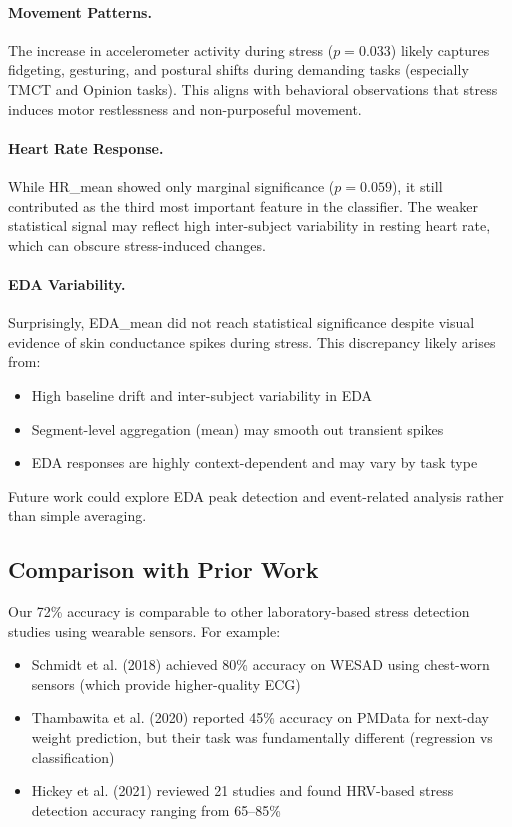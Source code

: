 \documentclass[12pt,letterpaper]{article}
\begin{document}
\paragraph{Movement Patterns.} The increase in accelerometer activity during stress ($p = 0.033$) likely captures fidgeting, gesturing, and postural shifts during demanding tasks (especially TMCT and Opinion tasks). This aligns with behavioral observations that stress induces motor restlessness and non-purposeful movement.

\paragraph{Heart Rate Response.} While HR\_mean showed only marginal significance ($p = 0.059$), it still contributed as the third most important feature in the classifier. The weaker statistical signal may reflect high inter-subject variability in resting heart rate, which can obscure stress-induced changes.

\paragraph{EDA Variability.} Surprisingly, EDA\_mean did not reach statistical significance despite visual evidence of skin conductance spikes during stress. This discrepancy likely arises from:
\begin{itemize}
    \item High baseline drift and inter-subject variability in EDA
    \item Segment-level aggregation (mean) may smooth out transient spikes
    \item EDA responses are highly context-dependent and may vary by task type
\end{itemize}

Future work could explore EDA peak detection and event-related analysis rather than simple averaging.

\subsection{Comparison with Prior Work}

Our 72\% accuracy is comparable to other laboratory-based stress detection studies using wearable sensors. For example:
\begin{itemize}
    \item Schmidt et al. (2018) achieved 80\% accuracy on WESAD using chest-worn sensors (which provide higher-quality ECG)
    \item Thambawita et al. (2020) reported 45\% accuracy on PMData for next-day weight prediction, but their task was fundamentally different (regression vs classification)
    \item Hickey et al. (2021) reviewed 21 studies and found HRV-based stress detection accuracy ranging from 65--85\%
\end{itemize}
\end{document}
